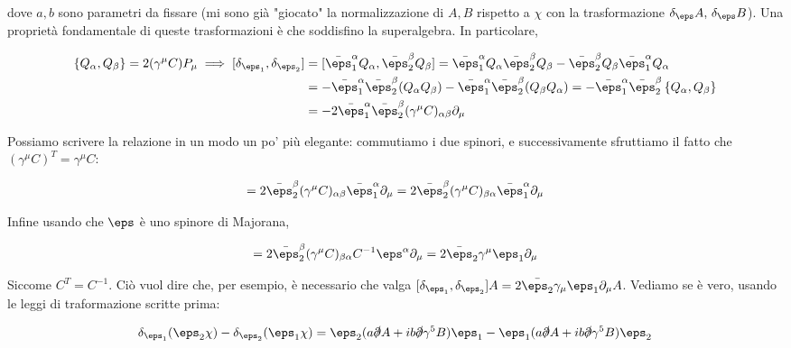 \documentclass{report}
\begin{document}
dove \(a, b\) sono parametri da fissare (mi sono già "giocato" la normalizzazione di \(A, B\) rispetto a \(\chi\) con la trasformazione \(\delta_\eps A, \, \delta_\eps B\)). Una proprietà fondamentale di queste trasformazioni è che soddisfino la superalgebra. In particolare, 

\begin{align}
    \left\{Q_\alpha, Q_\beta \right\} = 2(\gamma^\mu C)P_\mu \implies [\delta_{\eps_1}, \delta_{\eps_2}] &=[\bar{\eps}_1^\alpha Q_\alpha, \bar{\eps}^\beta_2 Q_\beta] = \bar{\eps}^\alpha_1 Q_\alpha \bar{\eps}^\beta_2 Q_\beta - \bar{\eps}^\beta_2 Q_\beta \bar{\eps}^\alpha_1 Q_\alpha \notag \\ 
    &= -\bar{\eps}_1^\alpha\bar{\eps}_2^\beta (Q_\alpha Q_\beta) -\bar{\eps}_1^\alpha\bar{\eps}_2^\beta (Q_\beta Q_\alpha) = -\bar{\eps}^\alpha_1 \bar{\eps}^\beta_2 \left\{Q_\alpha, Q_\beta \right\} \notag \\ 
    &= -2\bar{\eps}^{\alpha}_1 \bar{\eps}^\beta_2 (\gamma^\mu C)_{\alpha \beta} \partial_\mu
\end{align}

Possiamo scrivere la relazione in un modo un po' più elegante: commutiamo i due spinori, e successivamente sfruttiamo il fatto che \((\gamma^\mu C)^T = \gamma^\mu C\): 

\begin{align}
    [\delta_{\eps_1}, \delta_{\eps_2}] = 2\bar{\eps}_2^\beta (\gamma^\mu C)_{\alpha\beta}\bar{\eps}_1^\alpha \partial_\mu = 2\bar{\eps}_2^\beta (\gamma^\mu C)_{\beta\alpha}\bar{\eps}_1^\alpha \partial_\mu 
\end{align}

Infine usando che \(\eps\) è uno spinore di Majorana, 

\begin{align}
    [\delta_{\eps_1}, \delta_{\eps_2}] = 2\bar{\eps}_2^\beta (\gamma^\mu C)_{\beta\alpha} C^{-1} \eps^\alpha \partial_\mu = 2 \bar{\eps}_2 \gamma^\mu \eps_1 \partial_\mu
\end{align}

Siccome \(C^T = C^{-1}\). Ciò vuol dire che, per esempio, è necessario che valga \([\delta_{\eps_1}, \delta_{\eps_2}]A = 2\bar{\eps_2}\gamma_\mu \eps_1 \partial_\mu A\). Vediamo se è vero, usando le leggi di traformazione scritte prima: 

\begin{align}
    \delta_{\eps_1}(\eps_2 \chi) - \delta_{\eps_2}(\eps_1 \chi) = \eps_2 (a\slashed{\partial}A + ib\slashed{\partial}\gamma^5 B)\eps_1 - \eps_1(a\slashed{\partial}A + ib\slashed{\partial}\gamma^5 B)\eps_2
\end{align}
\end{document}
